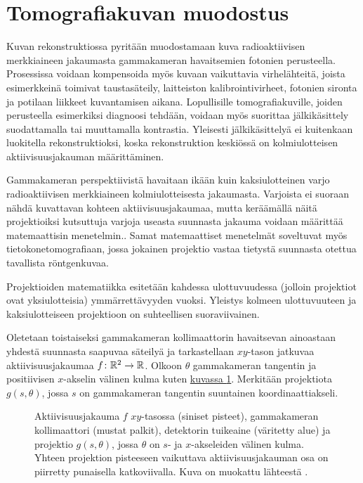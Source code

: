 \section{Tomografiakuvan muodostus}
Kuvan rekonstruktiossa pyritään muodostamaan kuva radioaktiivisen merkkiaineen jakaumasta gammakameran havaitsemien fotonien perusteella\cite{cherry_single_2012, bruyant_analytic_2002, beister_iterative_2012, willemink_evolution_2019, van_audenhaege_review_2015, bercovich_medical_2018}. Prosessissa voidaan kompensoida myös kuvaan vaikuttavia virhelähteitä, joista esimerkkeinä toimivat taustasäteily, laitteiston kalibrointivirheet, fotonien sironta ja potilaan liikkeet kuvantamisen aikana\cite{beister_iterative_2012, bruyant_analytic_2002}. Lopullisille tomografiakuville, joiden perusteella esimerkiksi diagnoosi tehdään, voidaan myös suorittaa jälkikäsittely suodattamalla tai muuttamalla kontrastia. Yleisesti jälkikäsittelyä ei kuitenkaan luokitella rekonstruktioksi, koska rekonstruktion keskiössä on kolmiulotteisen aktiivisuusjakauman määrittäminen.\cite{bruyant_analytic_2002}

Gammakameran perspektiivistä havaitaan ikään kuin kaksiulotteinen varjo radioaktiivisen merkkiaineen kolmiulotteisesta jakaumasta. Varjoista ei suoraan nähdä kuvattavan kohteen aktiivisuusjakaumaa, mutta keräämällä näitä projektioiksi kutsuttuja varjoja useasta suunnasta jakauma voidaan määrittää matemaattisin menetelmin.\cite{cherry_single_2012, bruyant_analytic_2002, beister_iterative_2012, willemink_evolution_2019, van_audenhaege_review_2015, bercovich_medical_2018}. Samat matemaattiset menetelmät soveltuvat myös tietokonetomografiaan, jossa jokainen projektio vastaa tietystä suunnasta otettua tavallista röntgenkuvaa.

Projektioiden matematiikka esitetään kahdessa ulottuvuudessa (jolloin projektiot ovat yksiulotteisia) ymmärrettävyyden vuoksi. Yleistys kolmeen ulottuvuuteen ja kaksiulotteiseen projektioon on suhteellisen suoraviivainen.

Oletetaan toistaiseksi gammakameran kollimaattorin havaitsevan ainoastaan yhdestä suunnasta saapuvaa säteilyä ja tarkastellaan $xy$-tason jatkuvaa aktiivisuusjakaumaa $f\colon\mathbb{R}^{2}\to\mathbb{R}$. Olkoon $\theta$ gammakameran tangentin ja positiivisen $x$-akselin välinen kulma kuten \hyperref[fig:projektio]{kuvassa \ref*{fig:projektio}}. Merkitään projektiota $g(s, \theta)$, jossa $s$ on gammakameran tangentin suuntainen koordinaattiakseli.

\begin{figure}[H]
    \centering
    \captionsetup{width=.9\textwidth}
    
    \caption{Aktiivisuusjakauma $f$ $xy$-tasossa (siniset pisteet), gammakameran kollimaattori (mustat palkit), detektorin tuikeaine (väritetty alue) ja projektio $g(s, \theta)$, jossa $\theta$ on $s$- ja $x$-akseleiden välinen kulma. Yhteen projektion pisteeseen vaikuttava aktiivisuusjakauman osa on piirretty punaisella katkoviivalla. Kuva on muokattu lähteestä \cite{bruyant_analytic_2002}.}
    \label{fig:projektio}
\end{figure}

